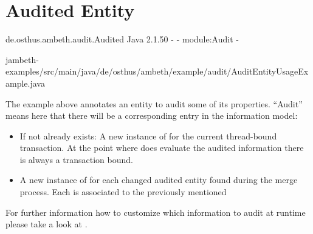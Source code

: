 \section{Audited Entity}
\label{feature:AuditedEntity}

\feature
	{de.osthus.ambeth.audit.Audited}
	{Java}
	{2.1.50}
	{-}
	{-}
	{module:Audit}
	{-}

	{jambeth-examples/src/main/java/de/osthus/ambeth/example/audit/AuditEntityUsageExample.java}

The example above annotates an entity to audit some of its properties. ``Audit'' means here that there will be a corresponding entry in the information model:

\begin{itemize}
	\item If not already exists: A new instance of  for the current thread-bound transaction. At the point where  does evaluate the audited information there is always a transaction bound.
	\item A new instance of  for each changed audited entity found during the merge process. Each  is associated to the previously mentioned 
\end{itemize}

For further information how to customize which information to audit at runtime please take a look at .


 